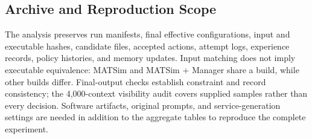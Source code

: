\subsection{Archive and Reproduction Scope}

The analysis preserves run manifests, final effective configurations, input and executable hashes, candidate files, accepted actions, attempt logs, experience records, policy histories, and memory updates. Input matching does not imply executable equivalence: MATSim and MATSim + Manager share a build, while other builds differ. Final-output checks establish constraint and record consistency; the 4,000-context visibility audit covers supplied samples rather than every decision. Software artifacts, original prompts, and service-generation settings are needed in addition to the aggregate tables to reproduce the complete experiment.

